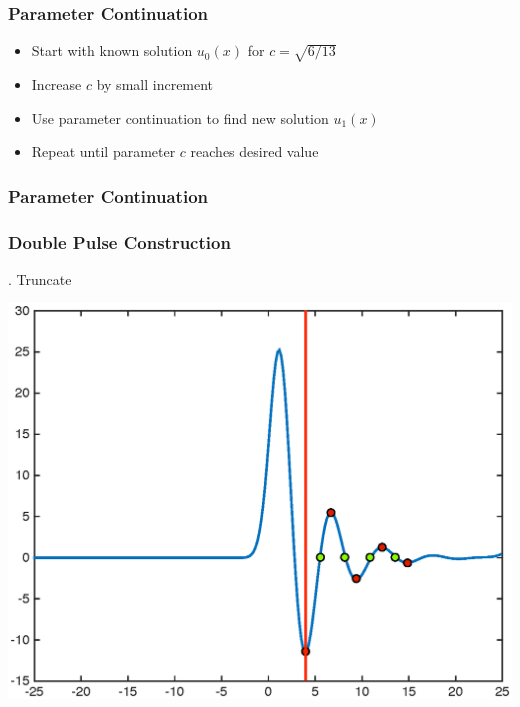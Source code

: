 \documentclass[16pt]{beamer}
\begin{document}
\begin{frame}
	\frametitle{Parameter Continuation}
	\fontsize{14}{7.2}\selectfont
	\begin{itemize}
		\item Start with known solution $u_0(x)$ for $c = \sqrt{6/13}$
		\item Increase $c$ by small increment
		\item Use parameter continuation to find new solution $u_1(x)$
		\item Repeat until parameter $c$ reaches desired value 
	\end{itemize}
\end{frame}

\begin{frame}
	\frametitle{Parameter Continuation}
	\begin{center}
	\end{center}
\end{frame}

\begin{frame}
	\frametitle{Double Pulse Construction}
	\fontsize{16}{7.2}. Truncate
	\begin{center}
	\includegraphics[width=0.8\linewidth]{images/singlepulsemagtailcut}
	\end{center}

\end{frame}
\end{document}
